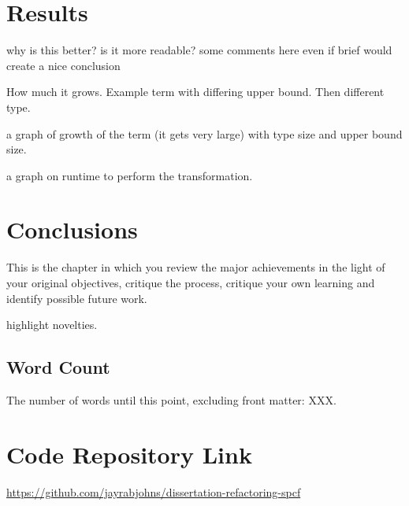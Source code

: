 \documentclass[12pt,a4paper]{report}
\theoremstyle{definition}
\theoremstyle{remark}
\begin{document}
\chapter{Results}
why is this better?
is it more readable?
some comments here even if brief would create a nice conclusion

How much it grows. Example term with differing upper bound. Then different type.

a graph of growth of the term (it gets very large) with type size and upper bound size.

a graph on runtime to perform the transformation.
\chapter{Conclusions}



This is the chapter in which you review the major achievements in the light of your original objectives, critique the process, critique your own learning and identify possible future work.

highlight novelties.

\vfill
\section{Word Count}
The number of words until this point, excluding front matter: XXX.



\appendix

\chapter{Code Repository Link}
\url{https://github.com/jayrabjohns/dissertation-refactoring-spcf}


\end{document}
